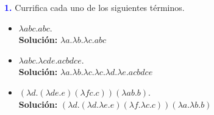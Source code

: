 \textbf{\textcolor{blue}{1.}} \Large
Currifica cada uno de los siguientes términos.

\renewcommand{\theenumi}{\alph{enumi}}
\begin{itemize}

\item $\lambda abc.abc$.\\
\textbf{Solución:}
$\lambda a. \lambda b. \lambda c. abc$
\item $\lambda abc. \lambda cde.acbdce$.\\
\textbf{Solución:}
$\lambda a.\lambda b.\lambda c.\lambda c.\lambda d.\lambda e.acbdce$
\item $(\lambda d.(\lambda de.e) (\lambda fc.c)) (\lambda ab.b)$.\\
\textbf{Solución:}
$(\lambda d.(\lambda d.\lambda e.e)(\lambda f.\lambda c.c))(\lambda a.\lambda b.b)$
\end{itemize}
